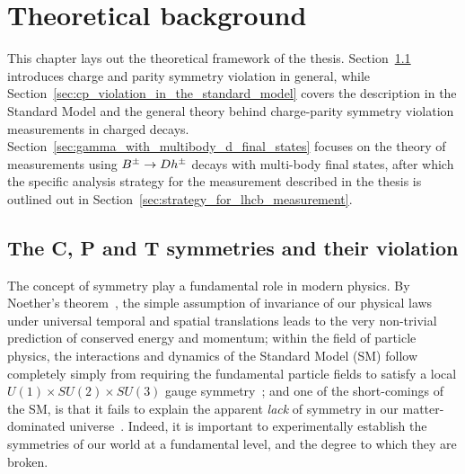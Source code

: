 

\chapter{Theoretical background}
\label{ch:2-litreview}


This chapter lays out the theoretical framework of the thesis. Section~\ref{sec:the_c_and_p_symmetries_and_their_violation} introduces charge and parity symmetry violation in general, while Section~\ref{sec:cp_violation_in_the_standard_model} covers the description in the Standard Model and the general theory behind charge-parity symmetry violation measurements in charged \B decays. Section~\ref{sec:gamma_with_multibody_d_final_states} focuses on the theory of measurements using ${{B}^\pm}\rightarrow{\ensuremath{D}} h^\pm$ decays with multi-body \D final states, after which the specific analysis strategy for the measurement described in the thesis is outlined out in Section~\ref{sec:strategy_for_lhcb_measurement}.


\section{The C, P and T symmetries and their violation} %
\label{sec:the_c_and_p_symmetries_and_their_violation}

The concept of symmetry play a fundamental role in modern physics. By Noether's theorem~\cite{noetherInvarianteVariationsprobleme1918}, the simple assumption of invariance of our physical laws under universal temporal and spatial translations leads to the very non-trivial prediction of conserved energy and momentum; 
%
within the field of particle physics, the interactions and dynamics of the Standard Model (SM) follow completely simply from requiring the fundamental particle fields to satisfy a local $U(1)\times SU(2)\times SU(3)$ gauge symmetry~\cite{donoghueDynamicsStandardModel2014};  
%
 and one of the short-comings of the SM, is that it fails to explain the apparent \emph{lack} of symmetry in our matter-dominated universe~\cite{sakarovViolationCPInvariance1966}.   
 Indeed, it is important to experimentally establish the symmetries of our world at a fundamental level, and the degree to which they are broken.

